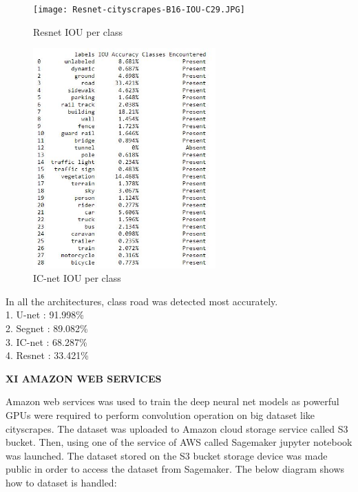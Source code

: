 \documentclass{IEEEtran}
\begin{document}
\begin{itemize}
\newpage

\begin{figure}[h]
    \centering
    \captionsetup{justification=centering}
    \texttt{[image: Resnet-cityscrapes-B16-IOU-C29.JPG]}
    \caption{Resnet IOU per class}
    \label{fig:Binary class segmented output}
\end{figure}

\begin{figure}[h]
    \centering
    \captionsetup{justification=centering}
    \includegraphics[width=7cm]{ICnet-cityscrapes-B16-IOU-C29.JPG}
    \caption{IC-net IOU per class}
    \label{fig:Binary class segmented output}
\end{figure}
\end{itemize}

In all the architectures, class road was detected most accurately.\\
1. U-net : 91.998\% \\
2. Segnet : 89.082\% \\
3. IC-net : 68.287\% \\
4. Resnet : 33.421\% \\
\newpage

\begin{center}
\textbf{XI AMAZON WEB SERVICES}    
\end{center}

Amazon web services was used to train the deep neural net models as powerful GPUs were required to perform convolution operation on big dataset like cityscrapes. The dataset was uploaded to Amazon cloud storage service called S3 bucket. Then, using one of the service of AWS called Sagemaker jupyter notebook was launched. The dataset stored on the S3 bucket storage device was made public in order to access the dataset from Sagemaker. The below diagram shows how to dataset is handled:
\end{document}
